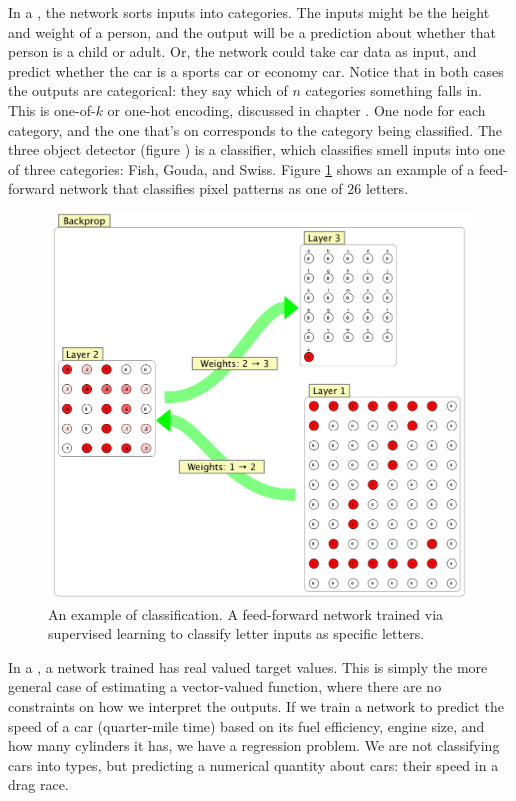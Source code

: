 In a , the network sorts inputs into categories. The inputs might be the height and weight of a person, and the output will be a prediction about whether that person is a child or adult. Or, the network could take car data as input, and predict whether the car is a sports car or economy car. Notice that in both cases the outputs are categorical: they say which of $n$ categories something falls in. This is one-of-$k$ or one-hot encoding, discussed in chapter . One node for each category, and the one that's on corresponds to the category being classified. The three object detector (figure ) is a classifier, which classifies smell inputs into one of three categories: Fish, Gouda, and Swiss. Figure \ref{F:letter_classify} shows an example of a feed-forward network that classifies pixel patterns as one of 26 letters.

\begin{figure}[h]
\centering
\includegraphics[scale=.4]{./images/letterClassification.png}
\caption[Simbrain screenshot.]{An example of classification. A feed-forward network trained via supervised learning to classify letter inputs as specific letters.}
\label{F:letter_classify}
\end{figure}

In a , a network trained has real valued target values. This is simply the more general case of estimating a vector-valued function, where there are no constraints on how we interpret the outputs. If we train a network to predict the speed of a car (quarter-mile time) based on its fuel efficiency, engine size, and how many cylinders it has, we have a regression problem. We are not classifying cars into types, but predicting a numerical quantity about cars: their speed in a drag race.

